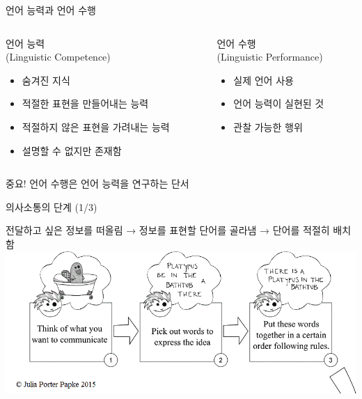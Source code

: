 \documentclass[11pt, aspectratio=169]{beamer}
\begin{document}
\begin{frame}[t]{언어 능력과 언어 수행}
  \begin{columns}

    \begin{column}[T]{0.5\textwidth}
      \begin{block}{언어 능력\\(Linguistic Competence)}
        \begin{itemize}
          \item 숨겨진 지식
          \item 적절한 표현을 만들어내는 능력
          \item 적절하지 않은 표현을 가려내는 능력
          \item 설명할 수 없지만 존재함
        \end{itemize}        
      \end{block}      
    \end{column}

    \begin{column}[T]{0.5\textwidth}
      \begin{block}{언어 수행\\(Linguistic Performance)}
        \begin{itemize}
          \item 실제 언어 사용
          \item 언어 능력이 실현된 것
          \item 관찰 가능한 행위
        \end{itemize}        
      \end{block}
    \end{column}

  \end{columns}

\vspace{0.5cm}
\begin{block}{중요!}
언어 수행은 언어 능력을 연구하는 단서
\end{block}
\end{frame}

\begin{frame}[t]{의사소통의 단계 (1/3)}
    \begin{center}
      전달하고 싶은 정보를 떠올림 → 정보를 표현할 단어를 골라냄 → 단어를 적절히 배치함
      \vfill
      \includegraphics[width=1.0\textwidth]{img/speech-chain_01.png}    
    \end{center}
\end{frame}
\end{document}
